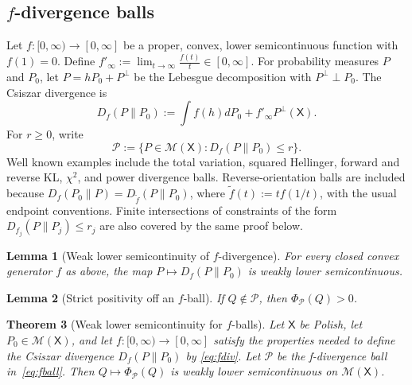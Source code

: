 \documentclass[11pt]{article}
\newcommand{\Pcal}{\mathcal{P}}
\newcommand{\X}{\mathsf{X}}
\newcommand{\M}{\mathcal{M}}
\newtheorem{theorem}{Theorem}[section]
\newtheorem{lemma}[theorem]{Lemma}
\theoremstyle{definition}
\theoremstyle{definition}
\begin{document}
\subsection{\texorpdfstring{\(f\)}{f}-divergence balls}

Let \(f:[0,\infty)\to[0,\infty]\) be a proper, convex, lower semicontinuous function with \(f(1)=0\).  Define
\(
f'_\infty:=\lim_{t\to\infty}\frac{f(t)}{t}\in[0,\infty].
\)
For probability measures \(P\) and \(P_0\), let \(P=hP_0+P^\perp\) be the Lebesgue decomposition with \(P^\perp\perp P_0\).  The Csiszar divergence is
\begin{equation}\label{eq:fdiv}
  D_f(P\|P_0):=\int f(h)d P_0+f'_\infty P^\perp(\X).
\end{equation}
For \(r\ge0\), write
\begin{equation}\label{eq:fball}
  \Pcal:=\{P\in\mathcal M(\X):D_f(P\|P_0)\le r\}.
\end{equation}
Well known examples include the total variation, squared Hellinger, forward and reverse KL, $\chi^2$, and power divergence balls. Reverse-orientation balls are included because \(D_f(P_0\|P)=D_{\widetilde f}(P\|P_0)\), where \(\widetilde f(t):=t f(1/t)\), with the usual endpoint conventions.  Finite intersections of constraints of the form \(D_{f_j}(P\|P_j)\le r_j\) are also covered by the same proof below.








\begin{lemma}[Weak lower semicontinuity of \(f\)-divergence]\label{lem:f-lsc}
For every closed convex generator \(f\) as above, the map \(P\mapsto D_f(P\|P_0)\) is weakly lower semicontinuous.
\end{lemma}



\begin{lemma}[Strict positivity off an \(f\)-ball]\label{lem:fball-positive}
If \(Q\notin\Pcal\), then \(\Phi_{\Pcal}(Q)>0\).
\end{lemma}




\begin{theorem}[Weak lower semicontinuity for \(f\)-balls]\label{thm:fball-lsc}
Let \(\X\) be Polish, let \(P_0\in\M(\X)\), and let
\(f:[0,\infty)\to[0,\infty]\) satisfy the properties needed to define the Csiszar divergence \(D_f(P\|P_0)\) by \eqref{eq:fdiv}.  Let $\Pcal$ be the f-divergence ball in~\eqref{eq:fball}.
Then
\(
  Q\mapsto \Phi_{\Pcal}(Q)
\)
is weakly lower semicontinuous on \(\M(\X)\).
\end{theorem}
\end{document}

